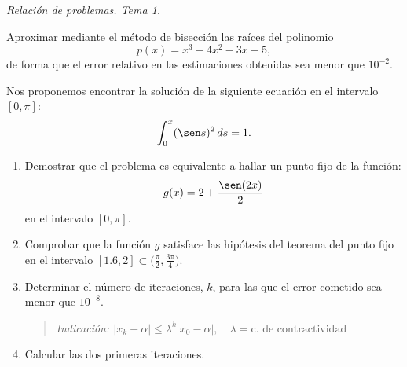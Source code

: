 \documentclass[11pt]{article}
\begin{document}
\begin{flushright}
  \LARGE\it Relación de problemas. Tema \huge 1.\\
  \bigskip
\end{flushright}

\begin{problemas}

  \begin{problema}
    Aproximar mediante el método de bisección las raíces del polinomio
    $$
    p(x) = x^3 + 4x^2 -3x -5,
    $$
    de forma que el error relativo en las estimaciones obtenidas sea
    menor que $10^{-2}$.
  \end{problema}
   \begin{problema}
     Nos proponemos encontrar la solución de la siguiente ecuación en
     el intervalo $[0,\pi]$: 
     $$
     \int_0^x (\sen s)^2 \, ds = 1.
     $$

     \begin{enumerate}
     \item Demostrar que el problema es equivalente a hallar un punto
       fijo de la función:
       $$
       g(x)=2 + \frac{\sen(2x)}{2}
       $$
       en el intervalo $[0,\pi]$.
     \item Comprobar que la función $g$ satisface las hipótesis del
       teorema del punto fijo en el intervalo $\displaystyle [1.6,2]\subset
       \bigg(\frac{\pi}{2},\frac{3\pi}{4}\bigg)$.
     \item Determinar el número de iteraciones, $k$, para las que el
       error cometido sea menor que $10^{-8}$. 
       \begin{quote}\em\small
         Indicación:
         $|x_k-\alpha|\le \lambda^k|x_0-\alpha|,
         \quad\lambda=\text{c. de contractividad}$
       \end{quote}
     \item Calcular las dos primeras iteraciones.
     \end{enumerate}
   \end{problema}

  

\end{problemas}
\end{document}
